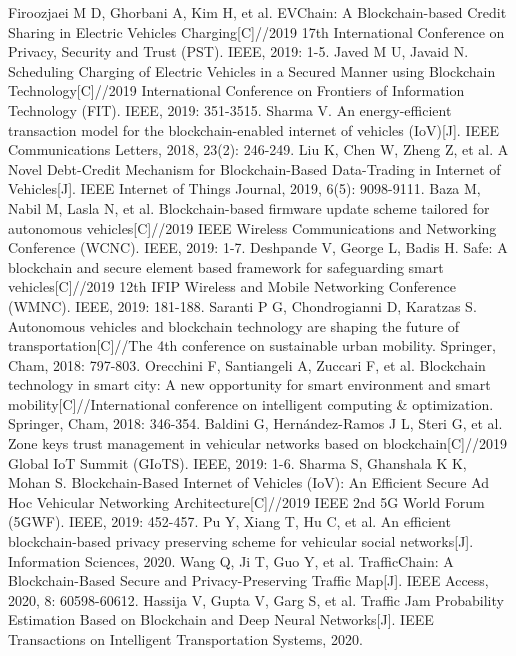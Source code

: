 \begin{thebibliography}{99}
 Firoozjaei M D, Ghorbani A, Kim H, et al. EVChain: A Blockchain-based Credit Sharing in Electric Vehicles Charging[C]//2019 17th International Conference on Privacy, Security and Trust (PST). IEEE, 2019: 1-5.
 Javed M U, Javaid N. Scheduling Charging of Electric Vehicles in a Secured Manner using Blockchain Technology[C]//2019 International Conference on Frontiers of Information Technology (FIT). IEEE, 2019: 351-3515.
 Sharma V. An energy-efficient transaction model for the blockchain-enabled internet of vehicles (IoV)[J]. IEEE Communications Letters, 2018, 23(2): 246-249.
 Liu K, Chen W, Zheng Z, et al. A Novel Debt-Credit Mechanism for Blockchain-Based Data-Trading in Internet of Vehicles[J]. IEEE Internet of Things Journal, 2019, 6(5): 9098-9111.
 Baza M, Nabil M, Lasla N, et al. Blockchain-based firmware update scheme tailored for autonomous vehicles[C]//2019 IEEE Wireless Communications and Networking Conference (WCNC). IEEE, 2019: 1-7.
 Deshpande V, George L, Badis H. Safe: A blockchain and secure element based framework for safeguarding smart vehicles[C]//2019 12th IFIP Wireless and Mobile Networking Conference (WMNC). IEEE, 2019: 181-188.
 Saranti P G, Chondrogianni D, Karatzas S. Autonomous vehicles and blockchain technology are shaping the future of transportation[C]//The 4th conference on sustainable urban mobility. Springer, Cham, 2018: 797-803.
 Orecchini F, Santiangeli A, Zuccari F, et al. Blockchain technology in smart city: A new opportunity for smart environment and smart mobility[C]//International conference on intelligent computing \& optimization. Springer, Cham, 2018: 346-354.
 Baldini G, Hernández-Ramos J L, Steri G, et al. Zone keys trust management in vehicular networks based on blockchain[C]//2019 Global IoT Summit (GIoTS). IEEE, 2019: 1-6.
 Sharma S, Ghanshala K K, Mohan S. Blockchain-Based Internet of Vehicles (IoV): An Efficient Secure Ad Hoc Vehicular Networking Architecture[C]//2019 IEEE 2nd 5G World Forum (5GWF). IEEE, 2019: 452-457.
 Pu Y, Xiang T, Hu C, et al. An efficient blockchain-based privacy preserving scheme for vehicular social networks[J]. Information Sciences, 2020.
 Wang Q, Ji T, Guo Y, et al. TrafficChain: A Blockchain-Based Secure and Privacy-Preserving Traffic Map[J]. IEEE Access, 2020, 8: 60598-60612.
 Hassija V, Gupta V, Garg S, et al. Traffic Jam Probability Estimation Based on Blockchain and Deep Neural Networks[J]. IEEE Transactions on Intelligent Transportation Systems, 2020.

\end{thebibliography}
